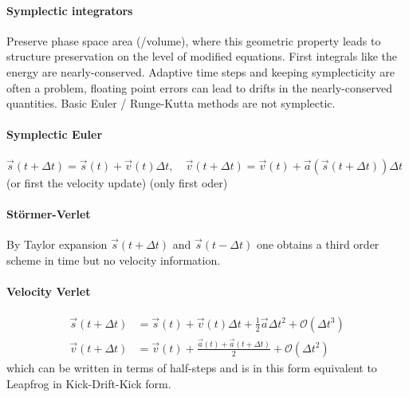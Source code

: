 \paragraph*{Symplectic integrators} Preserve phase space area (/volume), where this
geometric property leads to structure preservation on the level of modified equations.
First integrals like the energy are nearly-conserved. \textcolor{red1}{Adaptive
time steps and keeping symplecticity are often a problem, floating point errors
can lead to drifts in the nearly-conserved quantities.} Basic Euler / Runge-Kutta
methods are not symplectic.

\paragraph*{Symplectic Euler} $\vec{s}(t + \Delta t) = \vec{s}(t) + \vec{v}(t) \Delta t, \quad \vec{v}(t + \Delta t) = \vec{v}(t) + \vec{a}(\vec{s}(t+\Delta t)) \Delta t$ (or first the velocity update) (\textcolor{red1}{only first oder})

\paragraph*{Störmer-Verlet} By Taylor expansion $\vec{s}(t + \Delta t)$ and $\vec{s}(t - \Delta t)$ one obtains a third order scheme in time
but no velocity information.

\paragraph*{Velocity Verlet}
\begin{equation}
    \begin{aligned}
      \vec{s}(t+\Delta t) &= \vec{s}(t) + \vec{v}(t) \Delta t + \frac{1}{2} \vec{a} \Delta t^2 +  \mathcal{O}(\Delta t^3) \\
      \vec{v}(t+\Delta t) &= \vec{v}(t) + \frac{\vec{a}(t) + \vec{a}(t + \Delta t)}{2} + \mathcal{O}(\Delta t^2)
    \end{aligned}
\end{equation}
which can be written in terms of half-steps and is in this form equivalent to Leapfrog in
Kick-Drift-Kick form.

